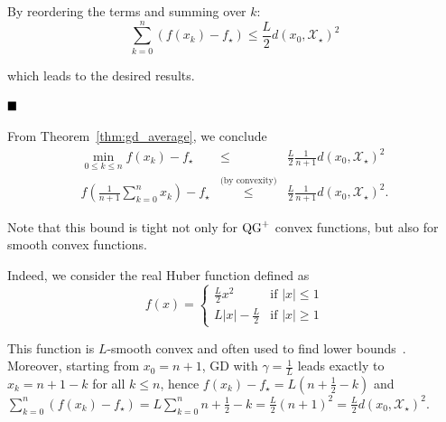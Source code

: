             By reordering the terms and summing over $k$:
            \begin{equation}
                \sum_{k=0}^n (f(x_k) - f_\star) \leq \frac{L}{2}d(x_0, \mathcal{X}_\star)^2
            \end{equation}
            
            which leads to the desired results.
            
        $\hfill\blacksquare$
    
        \begin{Rem}
            \label{rem:gd_average}
            From Theorem~\ref{thm:gd_average}, we conclude
            \begin{eqnarray*}
                \min_{0 \leq k \leq n} f(x_k) - f_\star & \leq & \frac{L}{2}\frac{1}{n+1} d(x_0, \mathcal{X}_\star)^2 \\
                f\left( \frac{1}{n+1}\sum_{k=0}^n x_k \right) - f_\star & \overset{\text{(by convexity)}}{\leq} & \frac{L}{2}\frac{1}{n+1} d(x_0, \mathcal{X}_\star)^2.
            \end{eqnarray*}
        \end{Rem}
    
        \begin{Rem}
            Note that this bound is tight not only for $\operatorname{QG}^+$ convex functions, but also for smooth convex functions.
            
            Indeed, we consider the real Huber function defined as
            \begin{equation}
                \label{eq:huber}
                f(x) = \left\{
                \begin{array}{cc}
                    \frac{L}{2}x^2 & \text{if } |x| \leq 1 \\
                    L|x| - \frac{L}{2} & \text{if } |x| \geq 1
                \end{array}
                \right.
            \end{equation}
            
            This function is $L$-smooth convex and often used to find lower bounds~\citep[See e.g.][]{drori2014performance,taylor2017smooth,kim2016optimized}.
            Moreover, starting from $x_0 = n + 1$, GD with $\gamma = \frac{1}{L}$ leads exactly to $x_k = n+1-k$ for all $k\leq n$, hence $f(x_k) - f_\star = L \left(n+\frac{1}{2}-k\right)$ and $\sum_{k=0}^n (f(x_k) - f_\star) = L \sum_{k=0}^n n+\frac{1}{2}-k = \frac{L}{2}(n+1)^2 = \frac{L}{2}d(x_0, \mathcal{X}_\star)^2$.
        \end{Rem}
    

